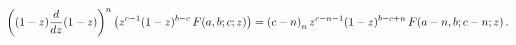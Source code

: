 \[\left((1-z)\frac{d}{dz}(1-z)\right)^{n}\left(z^{c-1}(1-z)^{b-c}\mathop{F\/}%
\nolimits\!\left(a,b;c;z\right)\right)=\left(c-n\right)_{n}z^{c-n-1}(1-z)^{b-c%
+n}\*\mathop{F\/}\nolimits\!\left(a-n,b;c-n;z\right).\]
